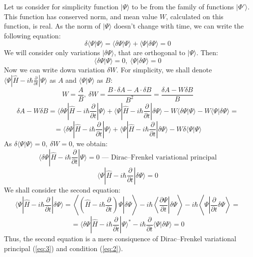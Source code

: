 Let us consider for simplicity function $|\Psi\rangle$ to be from the family of functions $|\Phi'\rangle$. 
This function has conserved norm, and mean value $W$, calculated on this function, is real.
As the norm of $|\Psi\rangle$ doesn't change with time, we can write the following equation:
$$\delta\langle\Psi|\Psi\rangle = \langle\delta\Psi|\Psi\rangle+\langle\Psi|\delta\Psi\rangle=0$$
We will consider only variations $|\delta\Psi\rangle$, that are orthogonal to $|\Psi\rangle$. Then:
\begin{equation}
\langle\delta\Psi|\Psi\rangle=0,\ \langle\Psi|\delta\Psi\rangle=0
\label{eq:2}
\end{equation}
Now we can write down variation $\delta W$. 
For simplicity, we shall denote $\langle\Psi|\hat{H}-i\hbar\frac{\partial}{\partial t}|\Psi\rangle$ as $A$ 
and $\langle\Psi|\Psi\rangle$ as $B$:
$$W = \frac{A}{B},\ \delta W = \frac{B\cdot\delta A - A\cdot\delta B}{B^2}=\frac{\delta A - W\delta B}{B}$$
$$\delta A - W\delta B = \langle\delta\Psi|\hat{H}-i\hbar\frac{\partial}{\partial t}|\Psi\rangle + %
			 \langle\Psi|\hat{H}-i\hbar\frac{\partial}{\partial t}|\delta\Psi\rangle - 
			 W\langle\delta\Psi|\Psi\rangle - W\langle\Psi|\delta\Psi\rangle = $$
$$ = \langle\delta\Psi|\hat{H}-i\hbar\frac{\partial}{\partial t}|\Psi\rangle + %
     \langle\Psi|\hat{H}-i\hbar\frac{\partial}{\partial t}|\delta\Psi\rangle - W\delta\langle\Psi|\Psi\rangle$$
As $\delta\langle\Psi|\Psi\rangle=0,\ \delta W = 0$, we obtain:
\begin{equation}
\langle\delta\Psi|\hat{H}-i\hbar\frac{\partial}{\partial t}|\Psi\rangle = 0\text{ --- Dirac--Frenkel variational principal}
\label{eq:3}
\end{equation}
$$\langle\Psi|\hat{H}-i\hbar\frac{\partial}{\partial t}|\delta\Psi\rangle = 0$$
We shall consider the second equation:
$$\langle\Psi|\hat{H}-i\hbar\frac{\partial}{\partial t}|\delta\Psi\rangle = %
  \left\langle\left.\left(\hat{H}-i\hbar\frac{\partial}{\partial t}\right)\Psi\right|\delta\Psi\right\rangle-%
  i\hbar\left.\left\langle\frac{\partial\Psi}{\partial t}\right|\delta\Psi\right\rangle-%
  i\hbar\left\langle\Psi\left|\frac{\partial}{\partial t}\delta\Psi\right\rangle\right.=$$
$$=\langle\delta\Psi|\hat{H}-i\hbar\frac{\partial}{\partial t}|\Psi\rangle^* -%
   i\hbar\frac{\partial}{\partial t}\langle\Psi|\delta\Psi\rangle = 0$$
Thus, the second equation is a mere consiquence of Dirac--Frenkel variational principal (\ref{eq:3}) and condition (\ref{eq:2}).


